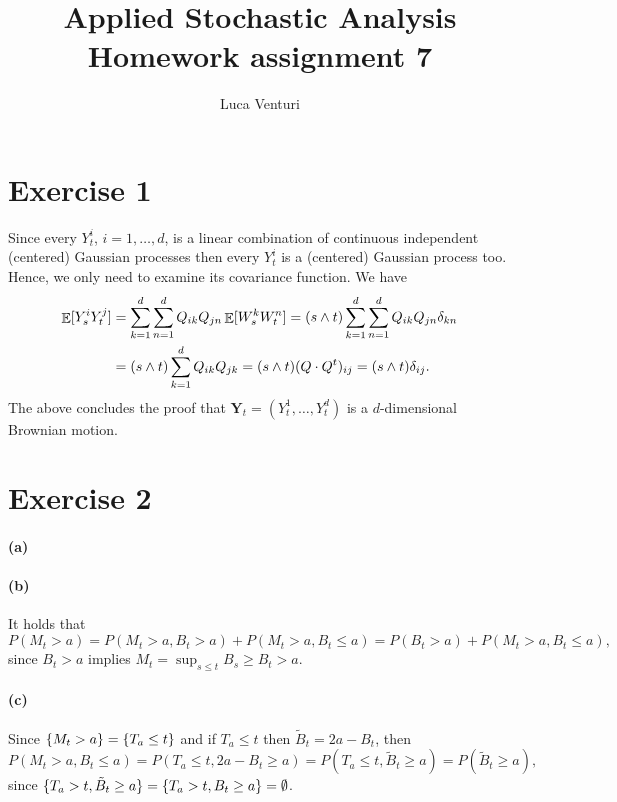 \documentclass[a4paper,11pt]{article}
\theoremstyle{definition}
\theoremstyle{plain}
\theoremstyle{remark}
\DeclarePairedDelimiter{\parq}{[}{]}
\DeclarePairedDelimiter{\bra}{\lbrace}{\rbrace}
\DeclareMathOperator*{\expval}{\mathbb{E}}
\begin{document}
\title{Applied Stochastic Analysis \\ Homework assignment 7}
\author{Luca Venturi}
\maketitle

\section*{Exercise 1}

Since every $Y_t^i$, $i=1,\dots,d$, is a linear combination of continuous independent (centered) Gaussian processes then every $Y_t^i$ is a (centered) Gaussian process too. Hence, we only need to examine its covariance function. We have
\begin{align*}
\expval\parq{Y^i_sY^j_t} & = \sum_{k=1}^d\sum_{n=1}^d Q_{ik}Q_{jn}\expval\parq{W^k_sW^n_t} = (s\wedge t)\sum_{k=1}^d\sum_{n=1}^d Q_{ik}Q_{jn}\delta_{kn} \\ & = (s\wedge t)\sum_{k=1}^dQ_{ik}Q_{jk} = (s\wedge t)(Q\cdot Q^t)_{ij} = (s\wedge t)\delta_{ij}.
\end{align*}
The above concludes the proof that $\mathbf{Y}_t = (Y^1_t,\dots,Y^d_t)$ is a $d$-dimensional Brownian motion. 

\section*{Exercise 2}

\paragraph*{(a)}

\paragraph*{(b)}

It holds that
$$
P(M_t>a) = P(M_t>a,B_t>a) + P(M_t>a,B_t\leq a) = P(B_t>a) + P(M_t>a,B_t\leq a),
$$
since $B_t>a$ implies $M_t = \sup_{s\leq t}B_s\geq B_t>a$.

\paragraph*{(c)}

Since $\bra{M_t > a} = \bra{T_a\leq t}$ and if $T_a\leq t$ then $\tilde{B}_t = 2a - B_t$, then
$$
P(M_t > a, B_t \leq a) = P(T_a\leq t, 2a - B_t \geq a) = P(T_a\leq t, \tilde{B}_t \geq a) = P(\tilde{B}_t \geq a),
$$ 
since $\bra{T_a> t, \tilde{B}_t \geq a} = \bra{T_a> t, B_t \geq a} = \emptyset$.
\end{document}
